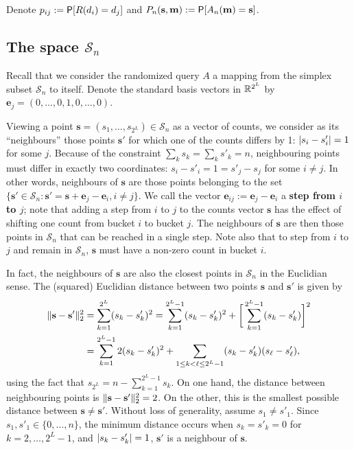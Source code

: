 \documentclass[11pt,draft]{article}
\newcommand{\Ssp}{\mathcal{S}}
\newcommand{\sv}{\mathbf{s}}
\newcommand{\mv}{\mathbf{m}}
\newcommand{\ev}{\mathbf{e}}
\begin{document}
Denote $p_{ij} := \P[R(d_i) = d_j]$ and $P_n(\sv,\mv) := \P[A_n(\mv) = \sv]$.

\subsection{The space $\Ssp_n$}

Recall that we consider the randomized query $A$ a mapping from the simplex
subset $\Ssp_n$ to itself.
Denote the standard basis vectors in $\R^{2^L}$ by
$\ev_j = (0,\dots, 0, 1, 0,\dots, 0)$.

Viewing a point $\sv = (s_1,\dots,s_{2^L}) \in\Ssp_n$ as a vector of counts,
we consider as its ``neighbours'' those points $\sv'$ for which one of the
counts differs by 1: $\abs{s_i - s'_i} = 1$ for some $j$.
Because of the constraint $\sum_k s_k = \sum_k s'_k = n$, neighbouring points
must differ in exactly two coordinates: $s_i - s'_i = 1 = s'_j - s_j$ for some
$i \neq j$.
In other words, neighbours of $\sv$ are those points belonging to the set
$\{\sv'\in\Ssp_n : \sv' = \sv + \ev_j - \ev_i, i \neq j \}$.
We call the vector $\ev_{ij} := \ev_j - \ev_i$ a \textbf{step from $i$ to $j$};
note that adding a step from $i$ to $j$ to the counts vector $\sv$ has the
effect of shifting one count from bucket $i$ to bucket $j$.
The neighbours of $\sv$ are then those points in $\Ssp_n$ that can be reached
in a single step. Note also that to step from $i$ to $j$ and remain in $\Ssp_n$,
$\sv$ must have a non-zero count in bucket $i$.

In fact, the neighbours of $\sv$ are also the closest points in $\Ssp_n$ in
the Euclidian sense.
The (squared) Euclidian distance between two points $\sv$ and $\sv'$ is given by
\begin{align*}
\norm{\sv - \sv'}_2^2 &= \sum_{k = 1}^{2^L} (s_k - s'_k)^2 =
\sum_{k = 1}^{2^L - 1} (s_k - s'_k)^2 +
\bigg[\sum_{k = 1}^{2^L-1} (s_k - s'_k) \bigg]^2 \\
&= \sum_{k = 1}^{2^L - 1} 2(s_k - s'_k)^2 +
\sum_{1 \leq k < \ell \leq 2^L-1} (s_k - s'_k)(s_\ell - s'_\ell),
\end{align*}
using the fact that $s_{2^L} = n - \sum_{k=1}^{2^L-1} s_k$.
On one hand, the distance between neighbouring points is
$\norm{\sv - \sv'}_2^2= 2$.
On the other, this is the smallest possible distance between $\sv\neq\sv'$.
Without loss of generality, assume $s_1 \neq s'_1$.
Since $s_1, s'_1 \in \{0,\dots,n\}$, the minimum distance occurs when
$s_k = s'_k = 0$ for $k = 2,\dots,2^L-1$, and $\abs{s_k - s'_k} = 1$, \ie $\sv'$
is a neighbour of $\sv$.
\end{document}
